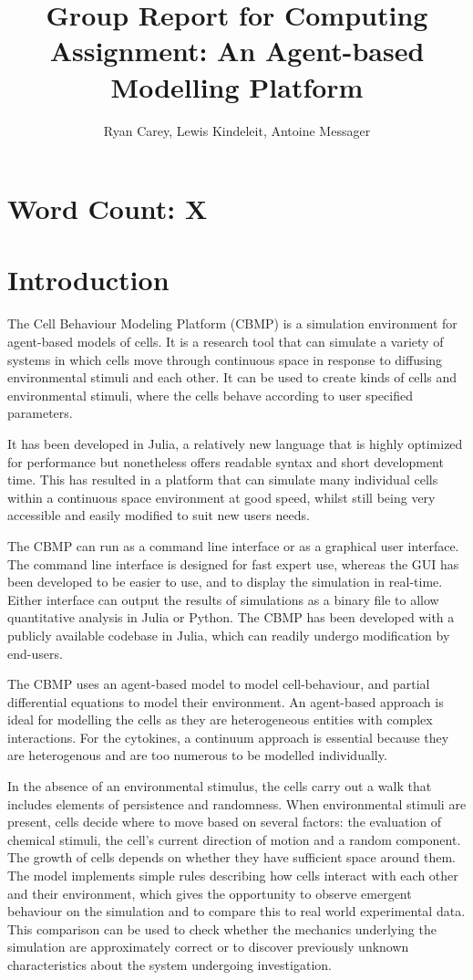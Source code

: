 \documentclass[12pt]{article}
\title{Group Report for Computing Assignment: An Agent-based Modelling Platform}
\author{Ryan Carey, Lewis Kindeleit, Antoine Messager}
\begin{document}
\maketitle

\newpage
\tableofcontents
\newpage
\section{Word Count: X}
\newpage
\section{Introduction}
The Cell Behaviour Modeling Platform (CBMP) is a simulation environment 
for agent-based models of cells. It is a research tool that can simulate 
a variety of systems in which cells move through continuous space in 
response to diffusing environmental stimuli and each other. It can be 
used to create kinds of cells and environmental stimuli, where the cells 
behave according to user specified parameters.

It has been developed in Julia, a relatively new language that is highly 
optimized for performance but nonetheless offers readable syntax and 
short development time. This has resulted in a platform that can 
simulate many individual cells within a continuous space environment at 
good speed, whilst still being very accessible and easily modified to 
suit new users needs.

The CBMP can run as a command line interface or as a graphical user 
interface. The command line interface is designed for fast expert use, 
whereas the GUI has been developed to be easier to use, and to display 
the simulation in real-time. Either interface can output the results of 
simulations as a binary file to allow quantitative analysis in Julia or 
Python. The CBMP has been developed with a publicly available codebase 
in Julia, which can readily undergo modification by end-users.

The CBMP uses an agent-based model to model cell-behaviour, and partial 
differential equations to model their environment. An agent-based 
approach is ideal for modelling the cells as they are heterogeneous 
entities with complex interactions. For the cytokines, a continuum 
approach is essential because they are heterogenous and are too numerous 
to be modelled individually.\cite{kaul15}

In the absence of an environmental stimulus, the cells carry out a walk 
that includes elements of persistence and randomness.\cite{codling08} When environmental 
stimuli are present, cells decide where to move based on several 
factors: the evaluation of chemical stimuli, the cell's current 
direction of motion and a random component. The growth of cells depends 
on whether they have sufficient space around them. The model implements 
simple rules describing how cells interact with each other and their 
environment, which gives the opportunity to observe emergent behaviour 
on the simulation and to compare this to real world experimental data. 
This comparison can be used to check whether the mechanics underlying 
the simulation are approximately correct or to discover previously 
unknown characteristics about the system undergoing investigation.
\end{document}
